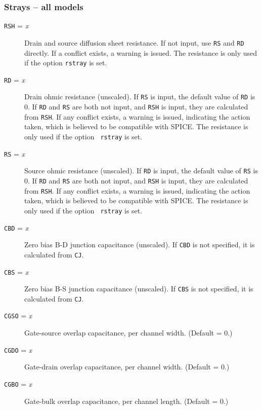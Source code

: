 \subsubsection{Strays -- all models}
\begin{description}

\item[{\tt RSH} = {\it x}] Drain and source diffusion sheet
resistance.  If not input, use {\tt RS} and {\tt RD} directly.  If a
conflict exists, a warning is issued.  The resistance is only used if
the option {\tt rstray} is set.

\item[{\tt RD} = {\it x}] Drain ohmic resistance (unscaled).  
If {\tt RS} is input, the default value of {\tt RD} is 0.  If {\tt RD}
and {\tt RS} are both not input, and {\tt RSH} is input, they are
calculated from {\tt RSH}.  If any conflict exists, a warning is
issued, indicating the action taken, which is believed to be
compatible with SPICE.  The resistance is only used if the option {\tt
rstray} is set.

\item[{\tt RS} = {\it x}] Source ohmic resistance (unscaled).  
If {\tt RD} is input, the default value of {\tt RS} is 0.  If {\tt RD}
and {\tt RS} are both not input, and {\tt RSH} is input, they are
calculated from {\tt RSH}.  If any conflict exists, a warning is
issued, indicating the action taken, which is believed to be
compatible with SPICE.  The resistance is only used if the option {\tt
rstray} is set.

\item[{\tt CBD} = {\it x}] Zero bias B-D junction capacitance (unscaled).  
If {\tt CBD} is not specified, it is calculated from {\tt CJ}.

\item[{\tt CBS} = {\it x}] Zero bias B-S junction capacitance (unscaled).  
If {\tt CBS} is not specified, it is calculated from {\tt CJ}.

\item[{\tt CGSO} = {\it x}] Gate-source overlap capacitance, per channel
width. (Default = 0.)

\item[{\tt CGDO} = {\it x}] Gate-drain overlap capacitance, per channel
width. (Default = 0.)

\item[{\tt CGBO} = {\it x}] Gate-bulk overlap capacitance, per channel
length. (Default = 0.)

\end{description}

